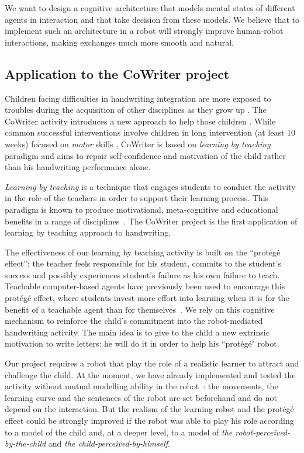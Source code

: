 \documentclass[10pt,a4paper,twocolumn]{article}
\begin{document}
We want to design a cognitive architecture that models mental states of different agents in interaction and that take decision from these models. We believe that to implement such an architecture in a robot will strongly improve human-robot interactions, making exchanges much more smooth and natural. 

\subsection{Application to the CoWriter project}
Children facing difficulties in handwriting integration are more exposed
to troubles during the acquisition of other disciplines as they grow up
\cite{Christensen2005}. 
The CoWriter activity introduces a new approach to help those children
\cite{Hood}. While common successful interventions involve children
in long intervention (at least 10 weeks) focused on \emph{motor} skills \cite{Hoy2011}, CoWriter is based on \emph{learning by teaching} paradigm and aims to repair self-confidence and motivation of the child rather than his handwriting performance alone.

\emph{Learning by teaching} is a technique that engages students to conduct the activity in the role of the teachers in order to support their learning process. This 
paradigm is known to produce motivational, meta-cognitive and educational
benefits in a range of disciplines~\cite{Rohrbeck2003}. The CoWriter project
is the first application of learning by teaching approach to handwriting. 

The effectiveness of our learning by teaching activity is built on the
``prot\'eg\'e effect'': the teacher feels responsible for his student, commits
to the student's success and possibly experiences student's failure as his own
failure to teach. Teachable computer-based agents have previously been used to
encourage this prot\'eg\'e effect, where students invest more effort into
learning when it is for the benefit of a teachable agent than for themselves~\cite{Chase2009}. We rely on this cognitive mechanism to reinforce the child's commitment into the
robot-mediated handwriting activity. The main idea is to give to the child a new extrinsic motivation to write letters: he will do it in order to help his ``prot\'eg\'e" robot.

Our project requires a robot that play the role of a realistic learner to attract and challenge the child. At the moment, we have already implemented and tested the activity without mutual modelling ability in the robot~\cite{Hood}: the movements, the learning curve and the sentences of the robot are set beforehand and do not depend on the interaction. But the realism of the learning robot and the prot\'eg\'e effect could be strongly improved if the robot was able to play his role according to a model of the child and, at a deeper level, to a model of \textit{the robot-perceived-by-the-child} and \textit{the child-perceived-by-himself}.
\end{document}
